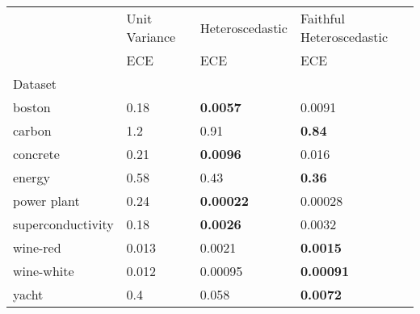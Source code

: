 \begin{tabular}{l|l|l|l}
\toprule
 & Unit Variance & Heteroscedastic & Faithful Heteroscedastic \\
 & ECE & ECE & ECE \\
Dataset &  &  &  \\
\midrule
boston & 0.18 & \bfseries 0.0057 & 0.0091 \\
carbon & 1.2 & 0.91 & \bfseries 0.84 \\
concrete & 0.21 & \bfseries 0.0096 & 0.016 \\
energy & 0.58 & 0.43 & \bfseries 0.36 \\
power plant & 0.24 & \bfseries 0.00022 & 0.00028 \\
superconductivity & 0.18 & \bfseries 0.0026 & 0.0032 \\
wine-red & 0.013 & 0.0021 & \bfseries 0.0015 \\
wine-white & 0.012 & 0.00095 & \bfseries 0.00091 \\
yacht & 0.4 & 0.058 & \bfseries 0.0072 \\
\bottomrule
\end{tabular}
